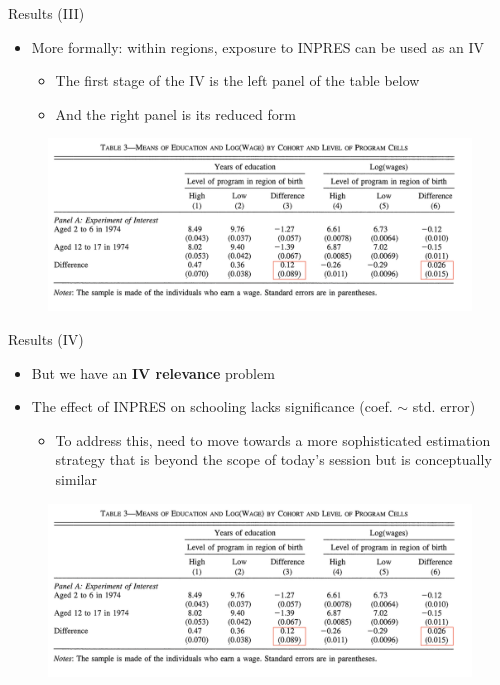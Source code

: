\documentclass[11pt,notes=hide,aspectratio=169,mathserif]{beamer}
\begin{document}
\begin{frame}{Results (III)}
\begin{itemize}
\item More formally: within regions, exposure to INPRES can be used as an IV
\begin{itemize}
     \item The first stage of the IV is the left panel of the table below
     \item And the right panel is its reduced form
\end{itemize}
\end{itemize}
\begin{figure}
    \centering
    \includegraphics[width=\textwidth]{inputs/Table3a.png}
\end{figure}
\end{frame}

\begin{frame}{Results (IV)}
\begin{itemize}
\item But we have an \textbf{IV relevance} problem
     \item The effect of INPRES on schooling lacks significance (coef. $\sim$ std. error) 
\begin{itemize}
     \item To address this, need to move towards a more sophisticated estimation strategy that is beyond the scope of today's session but is conceptually similar
\end{itemize}
\end{itemize}
\begin{figure}
    \centering
    \includegraphics[width=\textwidth]{inputs/Table3a.png}
\end{figure}
\end{frame}
\end{document}
